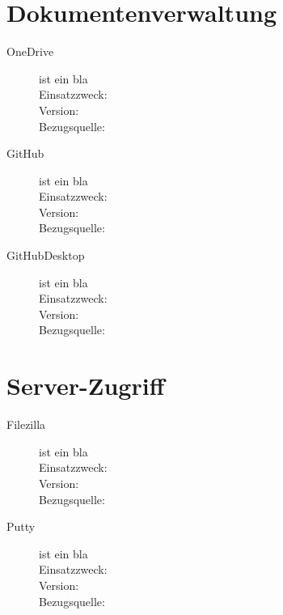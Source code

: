 





\section{Dokumentenverwaltung}

\begin{description}
	\item [OneDrive] ist ein bla \\
	Einsatzzweck: \\
	Version: \\
	Bezugsquelle: \\
	
	
	\item [GitHub] ist ein bla \\
	Einsatzzweck: \\
	Version: \\
	Bezugsquelle: \\
	
	
	\item [GitHubDesktop] ist ein bla \\
	Einsatzzweck: \\
	Version: \\
	Bezugsquelle: \\
\end{description}




\section{Server-Zugriff}

\begin{description}
	\item [Filezilla] ist ein bla \\
	Einsatzzweck: \\
	Version: \\
	Bezugsquelle: \\
	
	
	\item [Putty] ist ein bla \\
	Einsatzzweck: \\
	Version: \\
	Bezugsquelle: \\
\end{description}



